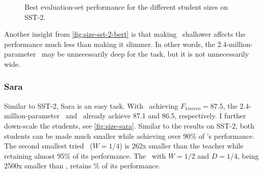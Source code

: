 {{{      \begin{figure}
      \caption{Best evaluation-set performance for the different student sizes on SST-2.}
      \label{fig:size-sst-2}
      \end{figure}
      Another insight from \autoref{fig:size-sst-2-bert} is that making \BERTS~shallower affects the performance much less than making it slimmer. In other words, the 2.4-million-parameter \BERTS~may be unnecessarily deep for the task, but it is not unnecessarily wide.
    }

    \subsubsection{Sara}{
      Similar to SST-2, Sara is an easy task. With \BERTT~achieving $F_{1 micro}=87.5$, the 2.4-million-parameter \BERTS~and \LSTMS~already achieve 87.1 and 86.5, respectively.
      I further down-scale the students, see \autoref{fig:size-sara}. Similar to the results on SST-2, both students can be made much smaller while achieving over 90\% of \BERTT's performance.
      The second smallest tried \LSTMS~($W=1/4$) is 262x smaller than the teacher while retaining almost 95\% of its performance.
      The \BERTS~with $W=1/2$ and $D=1/4$, being 2500x smaller than \BERTT, retains \% of its performance.

}}}
